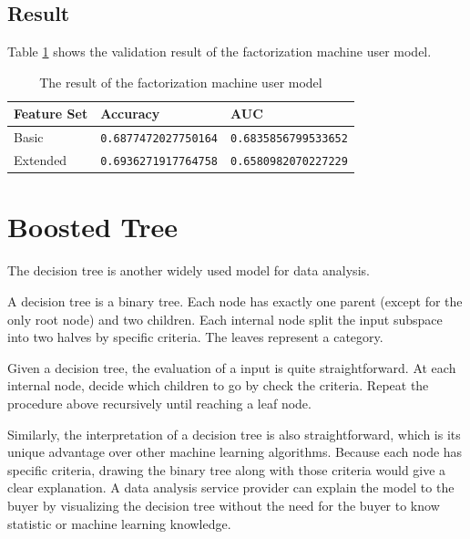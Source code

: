     \subsection{Result}

        Table \ref{table:fm result} shows the validation result of the factorization machine user model.

        \begin{table}[hpbt]
        \centering
        \begin{tabular}{lll}
            \hline
            Feature Set & Accuracy & AUC \\
            \hline
            Basic    & \verb|0.6877472027750164| & \verb|0.6835856799533652| \\
            Extended & \verb|0.6936271917764758| & \verb|0.6580982070227229| \\
            \hline
        \end{tabular}
        \caption{The result of the factorization machine user model}
        \label{table:fm result}
        \end{table}

\section{Boosted Tree}

        The decision tree is another widely used model for data analysis.

        A decision tree is a binary tree.
        Each node has exactly one parent (except for the only root node) and two children.
        Each internal node split the input subspace into two halves by specific criteria.
        The leaves represent a category.

        Given a decision tree, the evaluation of a input is quite straightforward.
        At each internal node, decide which children to go by check the criteria.
        Repeat the procedure above recursively until reaching a leaf node.

        Similarly, the interpretation of a decision tree is also straightforward,
        which is its unique advantage over other machine learning algorithms.
        Because each node has specific criteria,
        drawing the binary tree along with those criteria would give a clear explanation.
        A data analysis service provider can explain the model to the buyer by visualizing
        the decision tree without the need for the buyer to know statistic or machine learning knowledge.

